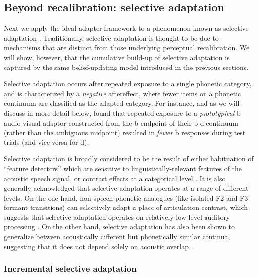 \subsection{Beyond recalibration: selective adaptation}
\label{sec:selective-adapt}


Next we apply the ideal adapter framework to a phenomenon known as selective adaptation \autocite{Eimas1973,Samuel1986}.  Traditionally, selective adaptation is thought to be due to mechanisms that are distinct from those underlying perceptual recalibration.  We will show, however, that the cumulative build-up of selective adaptation is captured by the same belief-updating model introduced in the previous sections.

Selective adaptation occurs after repeated exposure to a single phonetic category, and is characterized by a \emph{negative} aftereffect, where fewer items on a phonetic continuum are classified as the adapted category.  For instance, and as we will discuss in more detail below, \textcite{Vroomen2007} found that repeated exposure to a \emph{prototypical} \ph b audio-visual adaptor constructed from the \ph b endpoint of their \ph b-\ph d continuum (rather than the ambiguous midpoint) resulted in \emph{fewer} \ph b responses during test trials (and vice-versa for \ph d).

Selective adaptation is broadly considered to be the result of either habituation of ``feature detectors'' which are sensitive to linguistically-relevant features of the acoustic speech signal, or contrast effects at a categorical level \autocite{Samuel1986}.  It is also generally acknowledged that selective adaptation operates at a range of different levels.  On the one hand, non-speech phonetic analogues (like isolated F2 and F3 formant transitions) can selectively adapt a place of articulation contrast, which suggests that selective adaptation operates on relatively low-level auditory processing \autocite{Samuel1996}. On the other hand, selective adaptation has also been shown to generalize between acoustically different but phonetically similar continua, suggesting that it does not depend solely on acoustic overlap \autocite{Samuel1996,Sawusch1977}.

\subsubsection{Incremental selective adaptation}
\label{sec:incr-select-adapt}

